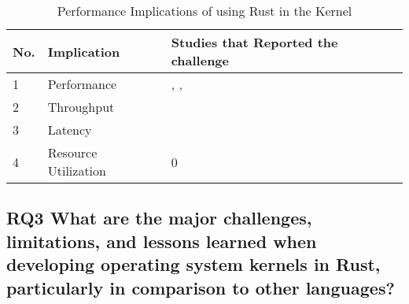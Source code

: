 \documentclass[sigconf]{acmart}
\begin{document}
\begin{table}
    \begin{tabular}{||l|l|l||}
    \hline
    No. & Implication & Studies that Reported the challenge\\
    \hline\hline
    1 & Performance & \cite{Gonzalez2023-ek}, \cite{Li2024-be}, \cite{Ma2023-ef}\\
    2 & Throughput & \cite{Gonzalez2023-ek}\\
    3 & Latency & \cite{Culic2022-bk} \\
    4 & Resource Utilization & 0 \\
    \hline
  \end{tabular}
  \caption{Performance Implications of using Rust in the Kernel}
    \label{tab:RQ2}
\end{table}

\subsection{RQ3 What are the major challenges, limitations, and lessons learned when
      developing operating system kernels in Rust, particularly in comparison to other languages?}
\end{document}
